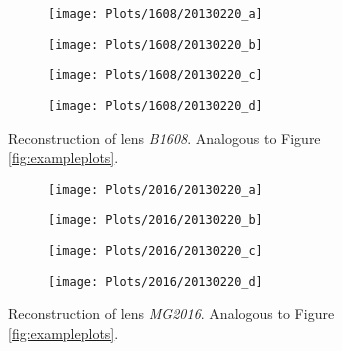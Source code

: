 \documentclass[10pt]{article}
\begin{document}
\begin{figure}[ht!]
 \centering
 \begin{subfigure}{.48\textwidth}
  \centering
  \texttt{[image: Plots/1608/20130220\_a]}
  \caption{}
 \end{subfigure}
 \begin{subfigure}{.48\textwidth}
  \centering
  \texttt{[image: Plots/1608/20130220\_b]}
  \caption{}
 \end{subfigure}
 
 \begin{subfigure}{.48\textwidth}
  \centering
  \texttt{[image: Plots/1608/20130220\_c]}
  \caption{}
 \end{subfigure}
 \begin{subfigure}{.48\textwidth}
  \centering
  \texttt{[image: Plots/1608/20130220\_d]}
  \caption{}
 \end{subfigure}
 \captionsetup{width=.93\textwidth}
 \caption{Reconstruction of lens \textit{B1608}. Analogous to Figure \ref{fig:exampleplots}.}
 \label{fig:1608}
\end{figure}

\begin{figure}[ht!]
 \centering
 \begin{subfigure}{.48\textwidth}
  \centering
  \texttt{[image: Plots/2016/20130220\_a]}
  \caption{}
 \end{subfigure}
 \begin{subfigure}{.48\textwidth}
  \centering
  \texttt{[image: Plots/2016/20130220\_b]}
  \caption{}
 \end{subfigure}
 
 \begin{subfigure}{.48\textwidth}
  \centering
  \texttt{[image: Plots/2016/20130220\_c]}
  \caption{}
 \end{subfigure}
 \begin{subfigure}{.48\textwidth}
  \centering
  \texttt{[image: Plots/2016/20130220\_d]}
  \caption{}
 \end{subfigure}
 \captionsetup{width=.93\textwidth}
 \caption{Reconstruction of lens \textit{MG2016}. Analogous to Figure \ref{fig:exampleplots}.}
 \label{fig:2016}
\end{figure}
\end{document}
